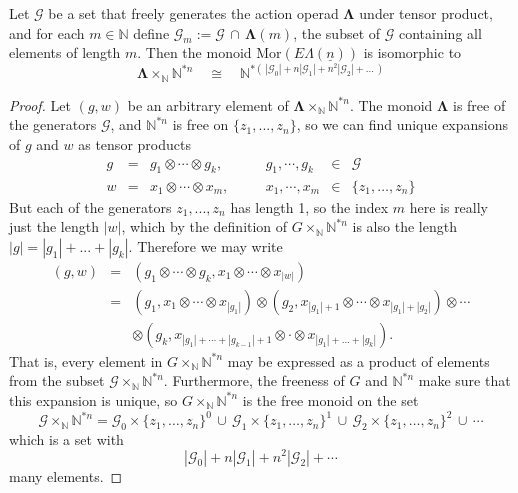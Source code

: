 \documentclass{amsbook} %
\newcommand{\ML}{\mathbf{\Lambda}}
\newcommand{\ELn}{E\Lambda(\underline{n})}
\numberwithin{section}{chapter}
\begin{document}
\begin{prop} \label{freemor} Let $\mathcal{G}$ be a set that freely generates the action operad $\ML$ under tensor product, and for each $m \in \mathbb{N}$ define $\mathcal{G}_m := \mathcal{G} \, \cap \,  \ML(m)$, the subset of $\mathcal{G}$ containing all elements of length $m$. Then the monoid $\mathrm{Mor}(\ELn)$ is isomorphic to
\[ \ML \times_{\mathbb{N}} \mathbb{N}^{\ast n} \quad \cong \quad \mathbb{N}^{\ast ( \, |\mathcal{G}_0| + n|\mathcal{G}_1| + n^2 |\mathcal{G}_2| + ... \, )} \]
\end{prop}
\begin{proof}
Let $(g, w)$ be an arbitrary element of $\ML \times_{\mathbb{N}} \mathbb{N}^{\ast n}$. The monoid $\ML$ is free of the generators $\mathcal{G}$, and $\mathbb{N}^{\ast n}$ is free on $\{z_1, ..., z_n\}$, so we can find unique expansions of $g$ and $w$ as tensor products
\[ \begin{array}{rclcrcl}
			g & = & g_1 \otimes \cdots \otimes g_k, & \quad & g_1, \cdots, g_k & \in & \mathcal{G} \\
			w & = & x_1 \otimes \cdots \otimes x_m, & \quad & x_1, \cdots, x_m & \in & \{z_1, \ldots, z_n\}
		\end{array}
\]
But each of the generators $z_1, ..., z_n$ has length 1, so the index $m$ here is really just the length $|w|$, which by the definition of $G \times_{\mathbb{N}} \mathbb{N}^{\ast n}$ is also the length $|g| = |g_1| + ... + |g_k|$. Therefore we may write
\[ \begin{array}{rll}
			(g, w) & = & (g_1 \otimes \cdots \otimes g_k, x_1 \otimes \cdots \otimes x_{|w|}) \\
			& = & (g_1, x_1 \otimes \cdots \otimes x_{|g_1|}) \otimes (g_2, x_{|g_1|+1} \otimes \cdots \otimes x_{|g_1|+|g_2|}) \otimes \cdots \\
			& & \otimes (g_k, x_{|g_1| + \cdots + |g_{k-1}|+1} \otimes \cdot \otimes x_{|g_1| + ... + |g_k|}).
		\end{array}
\]
That is, every element in $G \times_{\mathbb{N}} \mathbb{N}^{\ast n}$ may be expressed as a product of elements from the subset $\mathcal{G} \times_{\mathbb{N}} \mathbb{N}^{\ast n}$. Furthermore, the freeness of $G$ and $\mathbb{N}^{\ast n}$ make sure that this expansion is unique, so $G \times_{\mathbb{N}} \mathbb{N}^{\ast n}$ is the free monoid on the set 
\[ 
\mathcal{G} \times_{\mathbb{N}} \mathbb{N}^{\ast n}  =  \mathcal{G}_0 \times \{ z_1, \ldots, z_n \}^0  \, \cup \, \mathcal{G}_1 \times \{ z_1, \ldots, z_n \}^1 \, \cup \, \mathcal{G}_2 \times \{ z_1, \ldots, z_n \}^2 \, \cup \, \cdots
\]
which is a set with
\[
|\mathcal{G}_0| + n|\mathcal{G}_1| + n^2 |\mathcal{G}_2| + \cdots
\]
many elements.


\end{proof}
\end{document}
